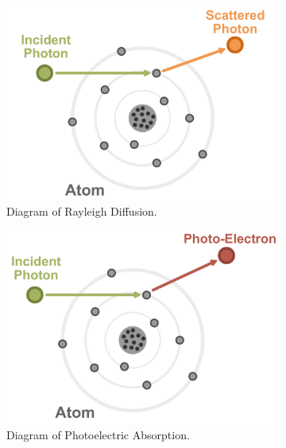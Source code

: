 \begin{figure}
	\centering
	\begin{subfigure}[b]{0.45\textwidth}
		\centering
		\includegraphics[width=\textwidth]{Rayleigh_diffusion.pdf}
		\caption{Diagram of Rayleigh Diffusion.}
		\label{fig:Rayleigh_diffusion}
	\end{subfigure}
	\hfill
	\begin{subfigure}[b]{0.45\textwidth}
		\centering
		\includegraphics[width=\textwidth]{photoelectric_absorption.pdf}
		\caption{Diagram of Photoelectric Absorption.}
		\label{fig:photoelectric_absorption}
	\end{subfigure}
	\\ \vspace{1cm}
	\begin{subfigure}[b]{0.45\textwidth}

\end{subfigure}
\end{figure}
